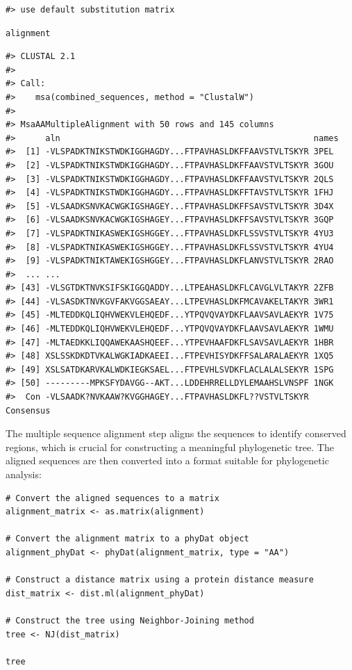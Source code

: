 \begin{verbatim}
#> use default substitution matrix
\end{verbatim}

\begin{verbatim}
alignment
\end{verbatim}

\begin{verbatim}
#> CLUSTAL 2.1  
#> 
#> Call:
#>    msa(combined_sequences, method = "ClustalW")
#> 
#> MsaAAMultipleAlignment with 50 rows and 145 columns
#>      aln                                                   names
#>  [1] -VLSPADKTNIKSTWDKIGGHAGDY...FTPAVHASLDKFFAAVSTVLTSKYR 3PEL
#>  [2] -VLSPADKTNIKSTWDKIGGHAGDY...FTPAVHASLDKFFAAVSTVLTSKYR 3GOU
#>  [3] -VLSPADKTNIKSTWDKIGGHAGDY...FTPAVHASLDKFFAAVSTVLTSKYR 2QLS
#>  [4] -VLSPADKTNIKSTWDKIGGHAGDY...FTPAVHASLDKFFTAVSTVLTSKYR 1FHJ
#>  [5] -VLSAADKSNVKACWGKIGSHAGEY...FTPAVHASLDKFFSAVSTVLTSKYR 3D4X
#>  [6] -VLSAADKSNVKACWGKIGSHAGEY...FTPAVHASLDKFFSAVSTVLTSKYR 3GQP
#>  [7] -VLSPADKTNIKASWEKIGSHGGEY...FTPAVHASLDKFLSSVSTVLTSKYR 4YU3
#>  [8] -VLSPADKTNIKASWEKIGSHGGEY...FTPAVHASLDKFLSSVSTVLTSKYR 4YU4
#>  [9] -VLSPADKTNIKTAWEKIGSHGGEY...FTPAVHASLDKFLANVSTVLTSKYR 2RAO 
#>  ... ...
#> [43] -VLSGTDKTNVKSIFSKIGGQADDY...LTPEAHASLDKFLCAVGLVLTAKYR 2ZFB
#> [44] -VLSASDKTNVKGVFAKVGGSAEAY...LTPEVHASLDKFMCAVAKELTAKYR 3WR1
#> [45] -MLTEDDKQLIQHVWEKVLEHQEDF...YTPQVQVAYDKFLAAVSAVLAEKYR 1V75
#> [46] -MLTEDDKQLIQHVWEKVLEHQEDF...YTPQVQVAYDKFLAAVSAVLAEKYR 1WMU
#> [47] -MLTAEDKKLIQQAWEKAASHQEEF...YTPEVHAAFDKFLSAVSAVLAEKYR 1HBR
#> [48] XSLSSKDKDTVKALWGKIADKAEEI...FTPEVHISYDKFFSALARALAEKYR 1XQ5
#> [49] XSLSATDKARVKALWDKIEGKSAEL...FTPEVHLSVDKFLACLALALSEKYR 1SPG
#> [50] ---------MPKSFYDAVGG--AKT...LDDEHRRELLDYLEMAAHSLVNSPF 1NGK
#>  Con -VLSAADK?NVKAAW?KVGGHAGEY...FTPAVHASLDKFL??VSTVLTSKYR Consensus
\end{verbatim}

The multiple sequence alignment step aligns the sequences to identify conserved regions, which is crucial for constructing a meaningful phylogenetic tree. The aligned sequences are then converted into a format suitable for phylogenetic analysis:

\begin{verbatim}
# Convert the aligned sequences to a matrix
alignment_matrix <- as.matrix(alignment)

# Convert the alignment matrix to a phyDat object
alignment_phyDat <- phyDat(alignment_matrix, type = "AA")

# Construct a distance matrix using a protein distance measure
dist_matrix <- dist.ml(alignment_phyDat)

# Construct the tree using Neighbor-Joining method
tree <- NJ(dist_matrix)

tree
\end{verbatim}

